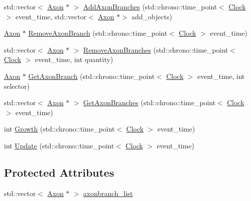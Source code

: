 \begin{DoxyCompactItemize}
\item 
std\+::vector$<$ \mbox{\hyperlink{class_axon}{Axon}} $\ast$ $>$ \mbox{\hyperlink{class_axon_a04969d98c3fbb671cba5daccacffc003}{Add\+Axon\+Branches}} (std\+::chrono\+::time\+\_\+point$<$ \mbox{\hyperlink{universe_8h_a0ef8d951d1ca5ab3cfaf7ab4c7a6fd80}{Clock}} $>$ event\+\_\+time, std\+::vector$<$ \mbox{\hyperlink{class_axon}{Axon}} $\ast$$>$ add\+\_\+objects)
\item 
\mbox{\hyperlink{class_axon}{Axon}} $\ast$ \mbox{\hyperlink{class_axon_a7b43ca7f5b696c72ac17a27fea3b2822}{Remove\+Axon\+Branch}} (std\+::chrono\+::time\+\_\+point$<$ \mbox{\hyperlink{universe_8h_a0ef8d951d1ca5ab3cfaf7ab4c7a6fd80}{Clock}} $>$ event\+\_\+time)
\item 
std\+::vector$<$ \mbox{\hyperlink{class_axon}{Axon}} $\ast$ $>$ \mbox{\hyperlink{class_axon_a4c7af6c0900ae766c55362bfbb827ce3}{Remove\+Axon\+Branches}} (std\+::chrono\+::time\+\_\+point$<$ \mbox{\hyperlink{universe_8h_a0ef8d951d1ca5ab3cfaf7ab4c7a6fd80}{Clock}} $>$ event\+\_\+time, int quantity)
\item 
\mbox{\hyperlink{class_axon}{Axon}} $\ast$ \mbox{\hyperlink{class_axon_a723b00504169712e47f7437111ad4ae3}{Get\+Axon\+Branch}} (std\+::chrono\+::time\+\_\+point$<$ \mbox{\hyperlink{universe_8h_a0ef8d951d1ca5ab3cfaf7ab4c7a6fd80}{Clock}} $>$ event\+\_\+time, int selector)
\item 
std\+::vector$<$ \mbox{\hyperlink{class_axon}{Axon}} $\ast$ $>$ \mbox{\hyperlink{class_axon_adf5796ef2f72ce56516b37e7e09e9d6c}{Get\+Axon\+Branches}} (std\+::chrono\+::time\+\_\+point$<$ \mbox{\hyperlink{universe_8h_a0ef8d951d1ca5ab3cfaf7ab4c7a6fd80}{Clock}} $>$ event\+\_\+time)
\item 
int \mbox{\hyperlink{class_axon_a0065c335bc57e0a75962bcbd91f35001}{Growth}} (std\+::chrono\+::time\+\_\+point$<$ \mbox{\hyperlink{universe_8h_a0ef8d951d1ca5ab3cfaf7ab4c7a6fd80}{Clock}} $>$ event\+\_\+time)
\item 
int \mbox{\hyperlink{class_axon_a472ee760a1727072afaff0035d1eedd9}{Update}} (std\+::chrono\+::time\+\_\+point$<$ \mbox{\hyperlink{universe_8h_a0ef8d951d1ca5ab3cfaf7ab4c7a6fd80}{Clock}} $>$ event\+\_\+time)
\end{DoxyCompactItemize}
\subsection*{Protected Attributes}
\begin{DoxyCompactItemize}
\item 
std\+::vector$<$ \mbox{\hyperlink{class_axon}{Axon}} $\ast$ $>$ \mbox{\hyperlink{class_axon_ab32c0e4335cc4da8fe1aace7c16a88bf}{axonbranch\+\_\+list}}
\end{DoxyCompactItemize}
